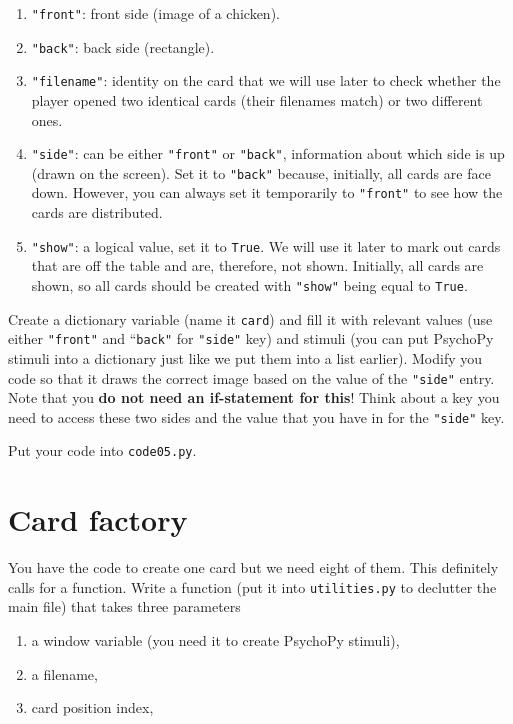 \documentclass[
]{book}
\providecommand{\tightlist}{%
  \setlength{\itemsep}{0pt}\setlength{\parskip}{0pt}}
\begin{document}
\begin{enumerate}
\def\labelenumi{\arabic{enumi}.}
\tightlist
\item
  \texttt{"front"}: front side (image of a chicken).
\item
  \texttt{"back"}: back side (rectangle).
\item
  \texttt{"filename"}: identity on the card that we will use later to check whether the player opened two identical cards (their filenames match) or two different ones.
\item
  \texttt{"side"}: can be either \texttt{"front"} or \texttt{"back"}, information about which side is up (drawn on the screen). Set it to \texttt{"back"} because, initially, all cards are face down. However, you can always set it temporarily to \texttt{"front"} to see how the cards are distributed.
\item
  \texttt{"show"}: a logical value, set it to \texttt{True}. We will use it later to mark out cards that are off the table and are, therefore, not shown. Initially, all cards are shown, so all cards should be created with \texttt{"show"} being equal to \texttt{True}.
\end{enumerate}

Create a dictionary variable (name it \texttt{card}) and fill it with relevant values (use either \texttt{"front"} and ``\texttt{back"} for \texttt{"side"} key) and stimuli (you can put PsychoPy stimuli into a dictionary just like we put them into a list earlier). Modify you code so that it draws the correct image based on the value of the \texttt{"side"} entry. Note that you \textbf{do not need an if-statement for this}! Think about a key you need to access these two sides and the value that you have in for the \texttt{"side"} key.

Put your code into \texttt{code05.py}.

\hypertarget{card-factory}{%
\section{Card factory}\label{card-factory}}

You have the code to create one card but we need eight of them. This definitely calls for a function. Write a function (put it into \texttt{utilities.py} to declutter the main file) that takes three parameters

\begin{enumerate}
\def\labelenumi{\arabic{enumi}.}
\tightlist
\item
  a window variable (you need it to create PsychoPy stimuli),
\item
  a filename,
\item
  card position index,
\end{enumerate}
\end{document}
